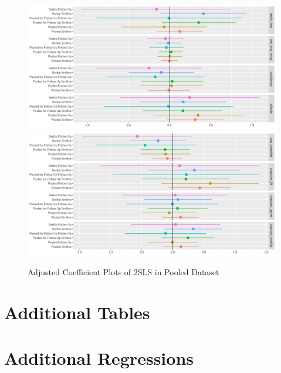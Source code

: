 \documentclass{article}
\begin{document}
\clearpage


\begin{figure}[H]
\includegraphics[width=\textwidth]{plots/Adjusted Coefficient Plot Knowledge and Attitudes.png}
\includegraphics[width=\textwidth]{plots/Adjusted Coefficient Plot Practices.png}
\caption{Adjusted Coefficient Plots of 2SLS in Pooled Dataset}
\end{figure}

\section{Additional Tables}







\section{Additional Regressions}






\end{document}
